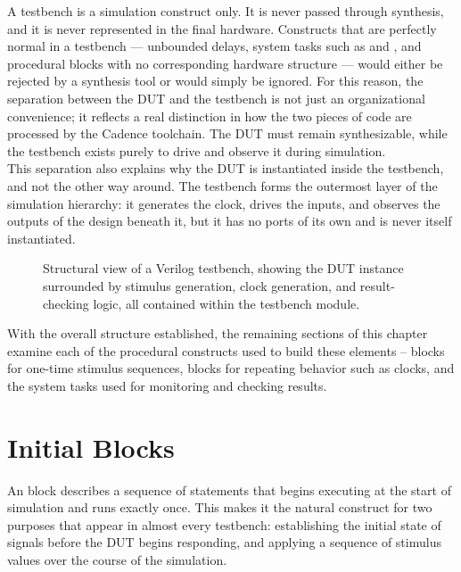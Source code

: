 A testbench is a simulation construct only. It is never passed through synthesis, and it is never represented in the final hardware. Constructs that are perfectly normal in a testbench — unbounded delays, system tasks such as  and , and procedural blocks with no corresponding hardware structure — would either be rejected by a synthesis tool or would simply be ignored. For this reason, the separation between the DUT and the testbench is not just an organizational convenience; it reflects a real distinction in how the two pieces of code are processed by the Cadence toolchain. The DUT must remain synthesizable, while the testbench exists purely to drive and observe it during simulation. \\


This separation also explains why the DUT is instantiated inside the testbench, and not the other way around. The testbench forms the outermost layer of the simulation hierarchy: it generates the clock, drives the inputs, and observes the outputs of the design beneath it, but it has no ports of its own and is never itself instantiated.


\begin{figure}[H]
    \centering
    \caption{Structural view of a Verilog testbench, showing the DUT instance surrounded by stimulus generation, clock generation, and result-checking logic, all contained within the testbench module.}
    \label{fig:verilog_testbench}
\end{figure}


With the overall structure established, the remaining sections of this chapter examine each of the procedural constructs used to build these elements --  blocks for one-time stimulus sequences,  blocks for repeating behavior such as clocks, and the system tasks used for monitoring and checking results.

\section{Initial Blocks}
An  block describes a sequence of statements that begins executing at the start of simulation and runs exactly once. This makes it the natural construct for two purposes that appear in almost every testbench: establishing the initial state of signals before the DUT begins responding, and applying a sequence of stimulus values over the course of the simulation.\\

